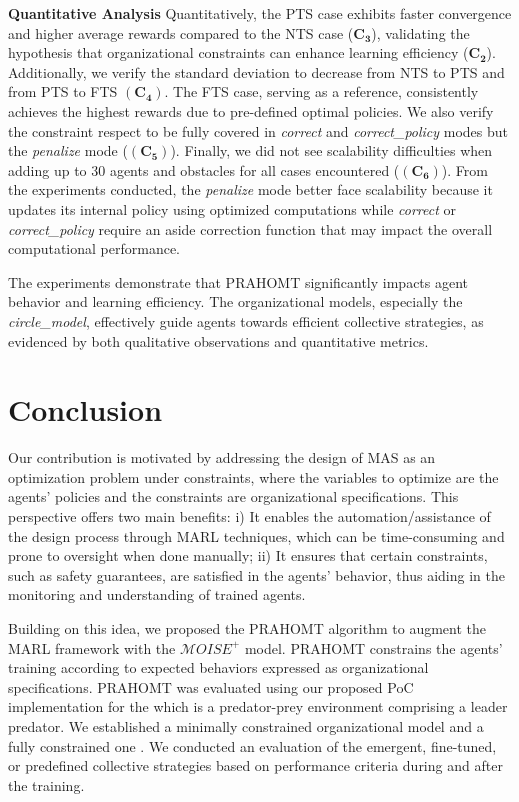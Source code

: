 \documentclass[runningheads]{llncs}
\theoremstyle{freethm}
\theoremstyle{proofoutline}
\begin{document}
\textbf{Quantitative Analysis} \quad Quantitatively, the PTS case exhibits faster convergence and higher average rewards compared to the NTS case ($\mathbf{C_3}$), validating the hypothesis that organizational constraints can enhance learning efficiency ($\mathbf{C_2}$). Additionally, we verify the standard deviation to decrease from NTS to PTS and from PTS to FTS $(\mathbf{C_4})$.
The FTS case, serving as a reference, consistently achieves the highest rewards due to pre-defined optimal policies. We also verify the constraint respect to be fully covered in \textit{correct} and \textit{correct\_policy} modes but the \textit{penalize} mode ($(\mathbf{C_5})$). Finally, we did not see scalability difficulties when adding up to 30 agents and obstacles for all cases encountered ($(\mathbf{C_6})$). From the experiments conducted, the \textit{penalize} mode better face scalability because it updates its internal policy using optimized computations while \textit{correct} or \textit{correct\_policy} require an aside correction function that may impact the overall computational performance.

The experiments demonstrate that PRAHOMT significantly impacts agent behavior and learning efficiency. The organizational models, especially the \textit{circle\_model}, effectively guide agents towards efficient collective strategies, as evidenced by both qualitative observations and quantitative metrics.


\section{Conclusion}

Our contribution is motivated by addressing the design of MAS as an optimization problem under constraints, where the variables to optimize are the agents' policies and the constraints are organizational specifications. This perspective offers two main benefits: i) It enables the automation/assistance of the design process through MARL techniques, which can be time-consuming and prone to oversight when done manually; ii) It ensures that certain constraints, such as safety guarantees, are satisfied in the agents' behavior, thus aiding in the monitoring and understanding of trained agents.

Building on this idea, we proposed the PRAHOMT algorithm to augment the MARL framework with the $\mathcal{M}OISE^+$ model. PRAHOMT constrains the agents' training according to expected behaviors expressed as organizational specifications. PRAHOMT was evaluated using our proposed PoC implementation for the  which is a predator-prey environment comprising a leader predator. We established a minimally constrained organizational model  and a fully constrained one . We conducted an evaluation of the emergent, fine-tuned, or predefined collective strategies based on performance criteria during and after the training.
\end{document}
